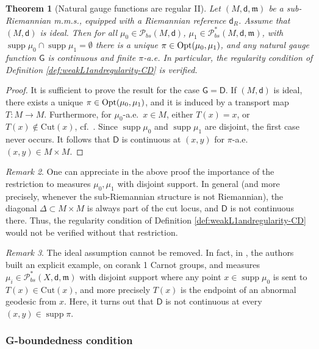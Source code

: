 \documentclass[11pt,a4paper]{article}
\theoremstyle{plain}
\newtheorem{theorem}{Theorem}[section]
\theoremstyle{definition}
\theoremstyle{remark}
\newtheorem{remark}[theorem]{Remark}
\numberwithin{equation}{section}
\newcommand{\Cut}{\mathrm{Cut}}
\DeclareMathOperator{\supp}{\mathrm{supp}}
\newcommand{\Opt}{{\rm Opt}}
\newcommand{\Prob}{\mathcal{P}}
\newcommand{\mm}{\mathfrak m}
\newcommand{\sfd}{\mathsf d}
\newcommand{\sfD}{\mathsf D}
\newcommand{\sfG}{\mathsf G}
\begin{document}
\begin{theorem}[Natural gauge functions are regular II]\label{t:regularityforstabilityCD}
Let $(M,\sfd,\mm)$ be a sub-Rieman\-nian m.m.s., equipped with a Riemannian reference $\sfd_R$. Assume that $(M,\sfd)$ is ideal. Then for all $\mu_{0}\in \mathcal{P}_{bs}(M,\sfd)$, $\mu_{1}\in \Prob_{bs}^{*}(M,\sfd, \mm)$, with $\supp\mu_0 \cap \supp\mu_1 = \emptyset$ there is a unique $\pi \in \Opt(\mu_0,\mu_1)$, and any natural gauge function $\sfG$ is continuous and finite $\pi$-a.e. In particular, the regularity condition of Definition \ref{def:weakL1andregularity-CD} is verified.
\end{theorem}
\begin{proof}
It is sufficient to prove the result for the case $\sfG=\sfD$. If $(M,\sfd)$ is ideal, there exists a unique $\pi \in \Opt(\mu_0,\mu_1)$, and it is induced by a transport map $T:M\to M$. Furthermore, for $\mu_0$-a.e.\ $x\in M$, either $T(x)=x$, or $T(x)\notin \Cut(x)$, cf.\ \cite[Cor.\ 38]{BRInv}. Since $\supp\mu_0$ and $\supp\mu_1$ are disjoint, the first case never occurs. It follows that $\sfD$ is continuous at $(x,y)$ for $\pi$-a.e.\ $(x,y) \in M\times M$.
\end{proof}
\begin{remark}
One can appreciate in the above proof the importance of the restriction to measures $\mu_0,\mu_1$ with disjoint support. In general (and more precisely, whenever the sub-Riemannian structure is not Riemannian), the diagonal $\Delta\subset M\times M$ is always part of the cut locus, and $\sfD$ is not continuous there. Thus, the regularity condition of Definition \ref{def:weakL1andregularity-CD} would not be verified without that restriction.
\end{remark}
\begin{remark}
The ideal assumption cannot be removed. In fact, in \cite[Fig.\ 2]{BKS2}, the authors built an explicit example, on corank 1 Carnot groups, and measures $\mu_i \in \mathcal{P}^*_{bs}(X,\sfd,\mm)$ with disjoint support where any point $x\in\supp\mu_0$ is sent to $T(x)\in \Cut(x)$, and more precisely $T(x)$ is the endpoint of an abnormal geodesic from $x$. Here, it turns out that $\sfD$ is not continuous at every $(x,y)\in \supp\pi$.
\end{remark}



\subsubsection{G-boundedness condition}\label{sec:boundedness}
\end{document}
